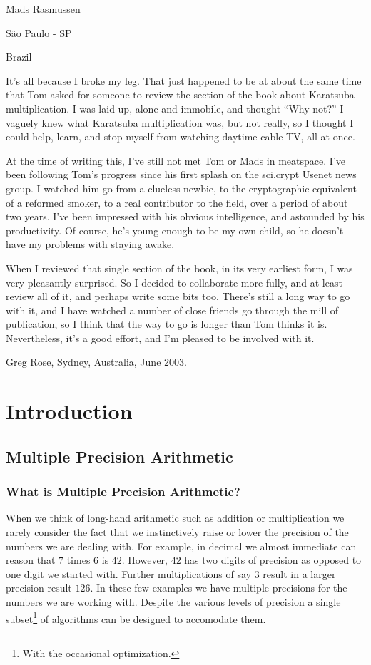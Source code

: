 \documentclass[b5paper]{book}
\begin{document}
\begin{flushright}
Mads Rasmussen

S\~{a}o Paulo - SP

Brazil
\end{flushright}

\newpage
It's all because I broke my leg. That just happened to be at about the same time that Tom asked for someone to review the section of the book about 
Karatsuba multiplication. I was laid up, alone and immobile, and thought ``Why not?'' I vaguely knew what Karatsuba multiplication was, but not 
really, so I thought I could help, learn, and stop myself from watching daytime cable TV, all at once.

At the time of writing this, I've still not met Tom or Mads in meatspace. I've been following Tom's progress since his first splash on the 
sci.crypt Usenet news group. I watched him go from a clueless newbie, to the cryptographic equivalent of a reformed smoker, to a real
contributor to the field, over a period of about two years. I've been impressed with his obvious intelligence, and astounded by his productivity. 
Of course, he's young enough to be my own child, so he doesn't have my problems with staying awake.

When I reviewed that single section of the book, in its very earliest form, I was very pleasantly surprised. So I decided to collaborate more fully, 
and at least review all of it, and perhaps write some bits too. There's still a long way to go with it, and I have watched a number of close 
friends go through the mill of publication, so I think that the way to go is longer than Tom thinks it is. Nevertheless, it's a good effort, 
and I'm pleased to be involved with it.

\begin{flushright}
Greg Rose, Sydney, Australia, June 2003. 
\end{flushright}

\mainmatter
\pagestyle{headings}
\chapter{Introduction}
\section{Multiple Precision Arithmetic}

\subsection{What is Multiple Precision Arithmetic?}
When we think of long-hand arithmetic such as addition or multiplication we rarely consider the fact that we instinctively
raise or lower the precision of the numbers we are dealing with.  For example, in decimal we almost immediate can 
reason that $7$ times $6$ is $42$.  However, $42$ has two digits of precision as opposed to one digit we started with.  
Further multiplications of say $3$ result in a larger precision result $126$.  In these few examples we have multiple 
precisions for the numbers we are working with.  Despite the various levels of precision a single subset\footnote{With the occasional optimization.}
 of algorithms can be designed to accomodate them.  
\end{document}
